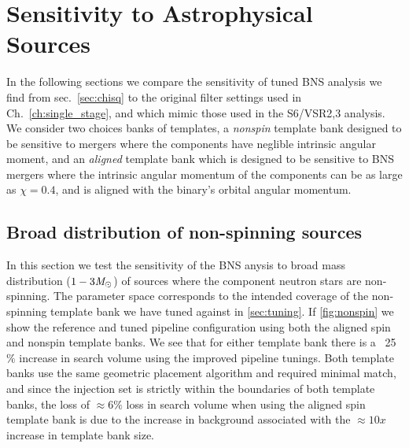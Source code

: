 \section{Sensitivity to Astrophysical Sources}

In the following sections we compare the sensitivity of tuned BNS analysis we find from sec.~\ref{sec:chisq} to the original filter settings used in Ch.~\ref{ch:single_stage}, and which mimic those used in the S6/VSR2,3 analysis. We consider two choices banks of templates, a \emph{nonspin} template bank designed to be sensitive to mergers where the components have neglible intrinsic angular moment, and an \emph{aligned} template bank which is designed to be sensitive to BNS mergers where the intrinsic angular momentum of the components can be as large as $\chi=0.4$, and is aligned with the binary's orbital angular momentum.

\subsection{Broad distribution of non-spinning sources}

In this section we test the sensitivity of the BNS anysis to broad mass distribution ($1-3 \mathit{M}_\odot$) of sources where the component neutron stars are non-spinning. The parameter space corresponds to the intended coverage of the non-spinning template bank we have tuned against in \ref{sec:tuning}.  If \ref{fig:nonspin} we show the reference and tuned pipeline configuration using both the aligned spin and nonspin template banks. We see that for either template bank there is a ~25$\%$ increase in search volume using the improved pipeline tunings. Both template banks use the same geometric placement algorithm and required minimal match, and since the injection set is strictly within the boundaries of both template banks, the loss of $\approx 6\%$ loss in search volume when using the aligned spin template bank is due to the increase in background associated with the $\approx 10x$ increase in template bank size.

